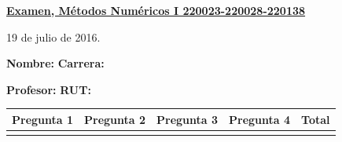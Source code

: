 \documentclass[11pt]{article}
\begin{document}
\hspace*{-1,5cm}

\vspace*{0.5cm} \centerline {\bf\underline{Examen, M\'etodos Num\'ericos I 220023-220028-220138 }}
\centerline{\textrm{19 de julio de 2016.}}  \vspace{0.2cm}


\textbf{Nombre:} \hspace{0.5\textwidth}\textbf{Carrera:}

\vspace{0.1cm}
\textbf{Profesor:}\hspace{0.5\textwidth} \textbf{ RUT:}

\begin{center}
 \begin{tabular}{||p{2cm}|p{2cm}|p{2cm}|p{2cm}||p{2cm}||}
 \hline
 Pregunta 1 &  Pregunta 2 &     Pregunta 3  & Pregunta 4 &Total\\
 \hline

  \vspace{1.5cm} & & & & \\
 \hline
 \end{tabular}
 \end{center}
\end{document}

